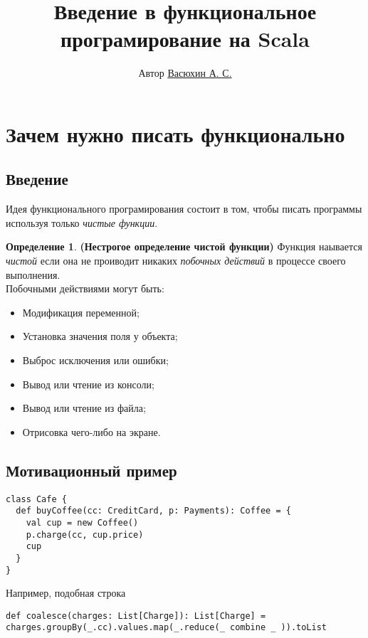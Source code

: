\documentclass[10pt,twoside]{article}
\title{Введение в функциональное програмирование на Scala}
\author{Автор \href{http://vk.com/id11423440}{Васюхин А. С.}}
\theoremstyle{plain}
\theoremstyle{definition}
\newtheorem{defi}{Определение}
\begin{document}
\maketitle
\tableofcontents

\section{Зачем нужно писать функционально}
\subsection{Введение}
Идея функционального програмирования состоит в том, чтобы писать программы используя только \textit{чистые функции}.\\
\begin{defi}
\textbf{(Нестрогое определение чистой функции)} Функция наывается \textit{чистой} если она не проиводит никаких \textit{побочных действий} в процессе своего выполнения.\\
Побочными действиями могут быть:
\begin{itemize}
\item Модификация переменной;
\item Установка значения поля у объекта;
\item Выброс исключения или ошибки;
\item Вывод или чтение из консоли;
\item Вывод или чтение из файла;
\item Отрисовка чего-либо на экране.
\end{itemize} 
\end{defi}
\subsection{Мотивационный пример}
\begin{lstlisting}
class Cafe {
  def buyCoffee(cc: CreditCard, p: Payments): Coffee = {
    val cup = new Coffee()
    p.charge(cc, cup.price)
    cup
  }
}
\end{lstlisting}

Например, подобная строка 

\texttt{def coalesce(charges: List[Charge]): List[Charge] = charges.groupBy(\_.cc).values.map(\_.reduce(\_ combine \_ )).toList}
\end{document}
